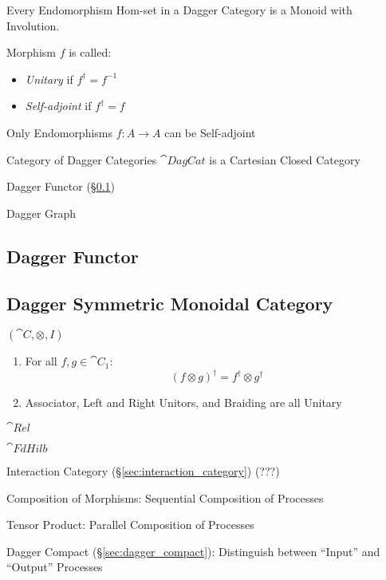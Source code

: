 Every Endomorphism Hom-set in a Dagger Category is a Monoid with
Involution.

Morphism $f$ is called:
\begin{itemize}
  \item \emph{Unitary} if $f^\dag = f^{-1}$
  \item \emph{Self-adjoint} if $f^\dag = f$
\end{itemize}

Only Endomorphisms $f : A \rightarrow A$ can be Self-adjoint

Category of Dagger Categories $\cat{DagCat}$ is a Cartesian Closed
Category

Dagger Functor (\S\ref{sec:dagger_functor})

Dagger Graph %



\subsection{Dagger Functor}\label{sec:dagger_functor}

\subsection{Dagger Symmetric Monoidal Category}
\label{sec:dagger_symmetric_monoidal}

$(\cat{C}, \otimes, I)$

\begin{enumerate}
  \item For all $f,g \in \cat{C}_1$:
    \[
      (f \otimes g)^\dag = f^\dag \otimes g^\dag
    \]
  \item Associator, Left and Right Unitors, and Braiding are all
    Unitary
\end{enumerate}

$\cat{Rel}$

$\cat{FdHilb}$

Interaction Category (\S\ref{sec:interaction_category}) (???)

Composition of Morphisms: Sequential Composition of Processes

Tensor Product: Parallel Composition of Processes

Dagger Compact (\S\ref{sec:dagger_compact}): Distinguish between
``Input'' and ``Output'' Processes





